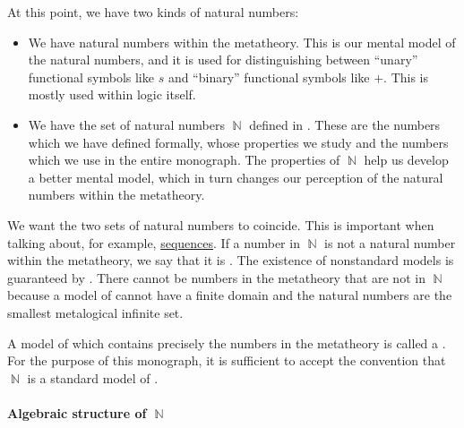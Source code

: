 \begin{remark}\label{rem:standard_models_of_arithmetic}
  At this point, we have two kinds of natural numbers:
  \begin{itemize}
    \item We have natural numbers within the metatheory. This is our mental model of the natural numbers, and it is used for distinguishing between \enquote{unary} functional symbols like \( s \) and \enquote{binary} functional symbols like \( + \). This is mostly used within logic itself.

    \item We have the set of natural numbers \( \BbbN \) defined in . These are the numbers which we have defined formally, whose properties we study and the numbers which we use in the entire monograph. The properties of \( \BbbN \) help us develop a better mental model, which in turn changes our perception of the natural numbers within the metatheory.
  \end{itemize}

  We want the two sets of natural numbers to coincide. This is important when talking about, for example, \hyperref[def:sequence]{sequences}. If a number in \( \BbbN \) is not a natural number within the metatheory, we say that it is . The existence of nonstandard models is guaranteed by . There cannot be numbers in the metatheory that are not in \( \BbbN \) because a model of  cannot have a finite domain and the natural numbers are the smallest metalogical infinite set.

  A model of  which contains precisely the numbers in the metatheory is called a . For the purpose of this monograph, it is sufficient to accept the convention that \( \BbbN \) is a standard model of .
\end{remark}

\paragraph{Algebraic structure of \( \BbbN \)}

